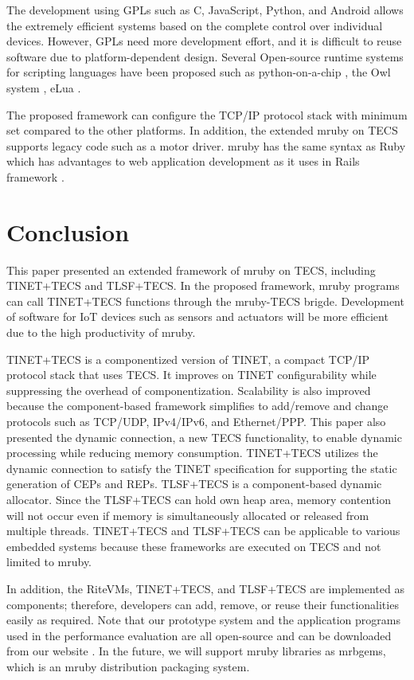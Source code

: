 \documentclass[JIP]{ipsj_v2/UTF8/ipsj}
\begin{document}
The development using GPLs such as C, JavaScript, Python, and Android allows the extremely efficient systems based on the complete control over individual devices.
However, GPLs need more development effort, and it is difficult to reuse software due to platform-dependent design.
Several Open-source runtime systems for scripting languages have been proposed such as python-on-a-chip \cite{url:python-on-a-chip}, the Owl system \cite{par:owl}, eLua \cite{url:eLua}.

The proposed framework can configure the TCP/IP protocol stack with minimum set compared to the other platforms.
In addition, the extended mruby on TECS supports legacy code such as a motor driver.
mruby has the same syntax as Ruby which has advantages to web application development as it uses in Rails framework \cite{url:rubyonrails}.



\section{Conclusion}
\label{sec:Conclusion}

This paper presented an extended framework of mruby on TECS, including TINET+TECS and TLSF+TECS.
In the proposed framework, mruby programs can call TINET+TECS functions through the mruby-TECS brigde.
Development of software for IoT devices such as sensors and actuators will be more efficient due to the high productivity of mruby.

TINET+TECS is a componentized version of TINET, a compact TCP/IP protocol stack that uses TECS.
It improves on TINET configurability while suppressing the overhead of componentization.
Scalability is also improved because the component-based framework simplifies to add/remove and change protocols such as TCP/UDP, IPv4/IPv6, and Ethernet/PPP.
This paper also presented the dynamic connection, a new TECS functionality, to enable dynamic processing while reducing memory consumption.
TINET+TECS utilizes the dynamic connection to satisfy the TINET specification for supporting the static generation of CEPs and REPs.
TLSF+TECS is a component-based dynamic allocator.
Since the TLSF+TECS can hold own heap area, memory contention will not occur even if memory is simultaneously allocated or released from multiple threads.
TINET+TECS and TLSF+TECS can be applicable to various embedded systems because these frameworks are executed on TECS and not limited to mruby.

In addition, the RiteVMs, TINET+TECS, and TLSF+TECS are implemented as components; therefore, developers can add, remove, or reuse their functionalities easily as required.
Note that our prototype system and the application programs used in the performance evaluation are all open-source and can be downloaded from our website \cite{url:TECS}.
In the future, we will support mruby libraries as mrbgems, which is an mruby distribution packaging system.\newline
\end{document}
